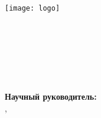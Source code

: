 

\thispagestyle{titlepagestyle}
\begin{SingleSpace}
\begin{center}
\texttt{[image: logo]}\\
{\small
\MakeUppercase{\Univer}\\
\MakeUppercase{\Faculty}\\
\MakeUppercase{\Department}\\[4\baselineskip]
}
\Author\\[2\baselineskip]
\textbf{
  \Title\\[3\baselineskip]
}
\MakeUppercase{\WorkType}\\[3\baselineskip]
\end{center}

\vspace*{3\baselineskip}

\noindent
\begin{minipage}{0.4\textwidth}
\phantom{MMMM}
\end{minipage}
\begin{minipage}{0.58\textwidth}
        \SingleSpacing
        \textbf{Научный руководитель:}\\
        \ifthenelse{\equal{\AcademicDegree}{}}{}{\AcademicDegree,\ }\Position, \Akademik\\
        \SciAdvisor\\[\baselineskip]
\end{minipage}

\end{SingleSpace}
